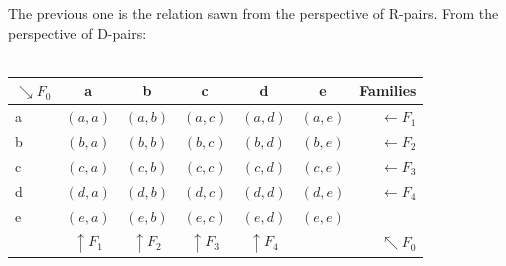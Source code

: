 		\noindent
		The previous one is the relation sawn from the perspective of R-pairs. From the perspective of D-pairs:\\\\		
		\begin{table}[h!]
			\begin{center}
				\begin{tabular}{|l|c|c|c|c|c|r|}
					\hline
						\cellcolor{applegreen!50} $ \searrow F_{0} $ &
						\cellcolor{lightgray} a &
						\cellcolor{lightgray} b &
						\cellcolor{lightgray} c &
						\cellcolor{lightgray} d &
						\cellcolor{lightgray} e &
						\cellcolor{lightgray!50} Families \\
					\hline
						\cellcolor{lightgray} a &
						\cellcolor{applegreen!50} $(a,a)$  &
						\cellcolor{bosunired!50}  $(a,b)$  &
						\cellcolor{bosunired!50}  $(a,c)$  &
						\cellcolor{bosunired!50}  $(a,d)$  &
						\cellcolor{bosunired!50}  $(a,e)$  &
						\cellcolor{lightgray} $ \leftarrow F_{1} $ \\
					\hline
						\cellcolor{lightgray} b &
						\cellcolor{bosunired!50}  $(b,a)$  &
						\cellcolor{applegreen!50} $(b,b)$  &
						\cellcolor{bosunired!50}  $(b,c)$  &
						\cellcolor{bosunired!50}  $(b,d)$  &
						\cellcolor{bosunired!50}  $(b,e)$  &
						\cellcolor{lightgray} $ \leftarrow F_{2} $ \\
					\hline
						\cellcolor{lightgray} c &
						\cellcolor{bosunired!50}  $(c,a)$  &
						\cellcolor{bosunired!50}  $(c,b)$  &
						\cellcolor{applegreen!50} $(c,c)$  &
						\cellcolor{bosunired!50}  $(c,d)$  &
						\cellcolor{bosunired!50}  $(c,e)$  &
						\cellcolor{lightgray} $ \leftarrow F_{3} $ \\
					\hline
						\cellcolor{lightgray} d &
						\cellcolor{bosunired!50}  $(d,a)$  &
						\cellcolor{bosunired!50}  $(d,b)$  &
						\cellcolor{bosunired!50}  $(d,c)$  &
						\cellcolor{applegreen!50} $(d,d)$  &
						\cellcolor{bosunired!50}  $(d,e)$  &
						\cellcolor{lightgray} $ \leftarrow F_{4} $ \\
					\hline
						\cellcolor{lightgray} e &
						\cellcolor{bosunired!50}  $(e,a)$  &
						\cellcolor{bosunired!50}  $(e,b)$  &
						\cellcolor{bosunired!50}  $(e,c)$  &
						\cellcolor{bosunired!50}  $(e,d)$  &
						\cellcolor{applegreen!50} $(e,e)$  &
						\cellcolor{black} \:\: \\
					\hline
						\cellcolor{black} \:\: &
						\cellcolor{lightgray}  $ \uparrow F_{1} $  &
						\cellcolor{lightgray}  $ \uparrow F_{2} $  &
						\cellcolor{lightgray}  $ \uparrow F_{3} $  &
						\cellcolor{lightgray}  $ \uparrow F_{4} $  &
						\cellcolor{black} \:\:  &
						\cellcolor{applegreen!50} $ \nwarrow F_{0} $ \\
					\hline			
				\end{tabular}
			\end{center}
		\end{table}	
		
